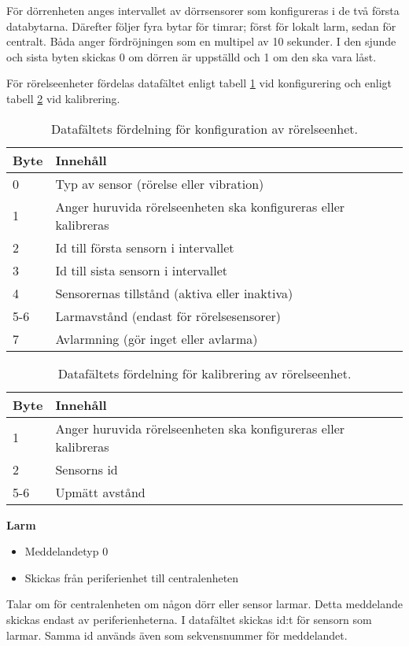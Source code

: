 För dörrenheten anges intervallet av dörrsensorer som konfigureras i de två första databytarna. Därefter följer fyra bytar för timrar; först för lokalt larm, sedan för centralt. Båda anger fördröjningen som en multipel av 10 sekunder. I den sjunde och sista byten skickas 0 om dörren är uppställd och 1 om den ska vara låst.




För rörelseenheter fördelas datafältet enligt tabell \ref{tab:rörelsekonfdata} vid konfigurering och enligt tabell \ref{tab:rörelsekaldata} vid kalibrering.
\begin{table}[htb]
	\centering
	\begin{tabular}{|l|l|}
		\hline
		Byte & Innehåll \\ \hline \hline
		0 & Typ av sensor (rörelse eller vibration) \\ \hline
		1 & Anger huruvida rörelseenheten ska konfigureras eller kalibreras \\ \hline
		2 & Id till första sensorn i intervallet \\ \hline
		3 & Id till sista sensorn i intervallet \\ \hline
		4 & Sensorernas tillstånd (aktiva eller inaktiva) \\ \hline
		5-6 & Larmavstånd (endast för rörelsesensorer) \\ \hline
		7 & Avlarmning (gör inget eller avlarma) \\ \hline
	\end{tabular}
	\caption{Datafältets fördelning för konfiguration av rörelseenhet.}
	\label{tab:rörelsekonfdata}
\end{table}

\begin{table}[htb]
	\centering
	\begin{tabular}{|l|l|}
		\hline
		Byte & Innehåll \\ \hline \hline
		1 & Anger huruvida rörelseenheten ska konfigureras eller kalibreras \\ \hline
		2 & Sensorns id\\ \hline
		5-6 & Upmätt avstånd\\ \hline
	\end{tabular}
	\caption{Datafältets fördelning för kalibrering av rörelseenhet.}
	\label{tab:rörelsekaldata}
\end{table}


\textbf{Larm}
\begin{itemize}
	\item Meddelandetyp 0
	\item Skickas från periferienhet till centralenheten
\end{itemize}	
Talar om för centralenheten om någon dörr eller sensor larmar. Detta meddelande skickas endast av periferienheterna. I datafältet skickas id:t för sensorn som larmar. Samma id används även som sekvensnummer för meddelandet.\\
